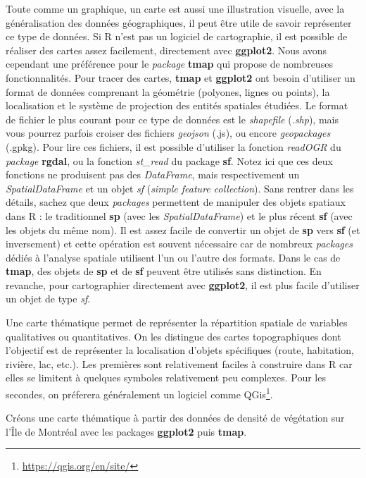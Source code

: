 \documentclass[
  11pt,
  french,
]{book}
\renewcommand{\href}[2]{#2\footnote{\url{#1}}}
\begin{document}
Toute comme un graphique, un carte est aussi une illustration visuelle, avec la généralisation des données géographiques, il peut être utile de savoir représenter ce type de données. Si R n'est pas un logiciel de cartographie, il est possible de réaliser des cartes assez facilement, directement avec \textbf{ggplot2}. Nous avons cependant une préférence pour le \emph{package} \textbf{tmap} qui propose de nombreuses fonctionnalités. Pour tracer des cartes, \textbf{tmap} et \textbf{ggplot2} ont besoin d'utiliser un format de données comprenant la géométrie (polyones, lignes ou points), la localisation et le système de projection des entités spatiales étudiées. Le format de fichier le plus courant pour ce type de données est le \emph{shapefile} (\emph{.shp}), mais vous pourrez parfois croiser des fichiers \emph{geojson} (.js), ou encore \emph{geopackages} (.gpkg). Pour lire ces fichiers, il est possible d'utiliser la fonction \emph{readOGR} du \emph{package} \textbf{rgdal}, ou la fonction \emph{st\_read} du package \textbf{sf}. Notez ici que ces deux fonctions ne produisent pas des \emph{DataFrame}, mais respectivement un \emph{SpatialDataFrame} et un objet \emph{sf} (\emph{simple feature collection}). Sans rentrer dans les détails, sachez que deux \emph{packages} permettent de manipuler des objets spatiaux dans R : le traditionnel \textbf{sp} (avec les \emph{SpatialDataFrame}) et le plus récent \textbf{sf} (avec les objets du même nom). Il est assez facile de convertir un objet de \textbf{sp} vers \textbf{sf} (et inversement) et cette opération est souvent nécessaire car de nombreux \emph{packages} dédiés à l'analyse spatiale utilisent l'un ou l'autre des formats. Dans le cas de \textbf{tmap}, des objets de \textbf{sp} et de \textbf{sf} peuvent être utilisés sans distinction. En revanche, pour cartographier directement avec \textbf{ggplot2}, il est plus facile d'utiliser un objet de type \emph{sf}.

Une carte thématique permet de représenter la répartition spatiale de variables qualitatives ou quantitatives. On les distingue des cartes topographiques dont l'objectif est de représenter la localisation d'objets spécifiques (route, habitation, rivière, lac, etc.). Les premières sont relativement faciles à construire dans R car elles se limitent à quelques symboles relativement peu complexes. Pour les secondes, on préferera généralement un logiciel comme \href{https://qgis.org/en/site/}{QGis}.

Créons une carte thématique à partir des données de densité de végétation sur l'Île de Montréal avec les packages \textbf{ggplot2} puis \textbf{tmap}.
\end{document}
